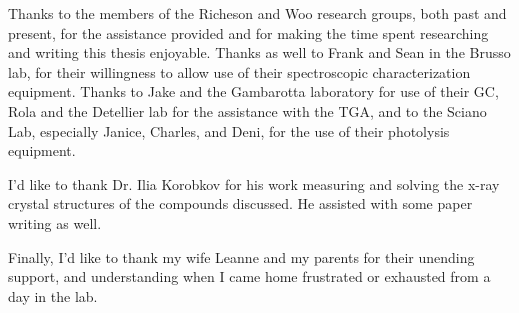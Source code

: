 Thanks to the members of the Richeson and Woo research groups, both past and present, for the assistance provided and for making the time spent researching and writing this thesis enjoyable. Thanks as well to Frank and Sean in the Brusso lab, for their willingness to allow use of their spectroscopic characterization equipment. Thanks to Jake and the Gambarotta laboratory for use of their GC, Rola and the Detellier lab for the assistance with the TGA, and to the Sciano Lab, especially Janice, Charles, and Deni, for the use of their photolysis equipment. 

I'd like to thank Dr. Ilia Korobkov for his work measuring and solving the x-ray crystal structures of the compounds discussed. He assisted with some paper writing as well. 

Finally, I'd like to thank my wife Leanne and my parents for their unending support, and understanding when I came home frustrated or exhausted from a day in the lab.